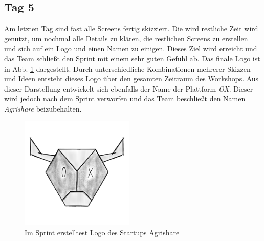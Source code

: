 \subsection*{\label{sec:Sprint-Umsetzung-Tag5}\thesubsection\quad Tag 5}Am letzten Tag sind fast alle Screens fertig skizziert. Die wird restliche Zeit wird genutzt, um nochmal alle Details zu klären, die restlichen Screens zu erstellen und sich auf ein Logo und einen Namen zu einigen. Dieses Ziel wird erreicht und das Team schließt den Sprint mit einem sehr guten Gefühl ab. Das finale Logo ist in Abb. \ref{fig:logoAgrishare} dargestellt. Durch unterschiedliche Kombinationen mehrerer Skizzen und Ideen entsteht dieses Logo über den gesamten Zeitraum des Workshops. Aus dieser Darstellung entwickelt sich ebenfalls der Name der Plattform \textit{OX}. Dieser wird jedoch nach dem Sprint verworfen und das Team beschließt den Namen \textit{Agrishare} beizubehalten. 
\begin{figure}
	\begin{center}
		\includegraphics[width=0.48\textwidth]{99_IMG/03_Umsetzung/Skizzeheller.png}
	\end{center}
	\vspace{-20pt}
  \caption{Im Sprint erstelltest Logo des Startups Agrishare}
		\label{fig:logoAgrishare}
  \vspace{-40pt}
\end{figure}



